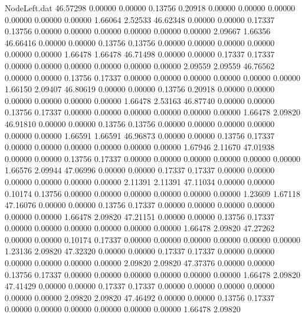 \begin{filecontents}{NodeLeft.dat}
  46.57298    0.00000    0.00000     0.13756    0.20918    0.00000    0.00000    0.00000    0.00000    0.00000    0.00000    1.66064    2.52533
  46.62348    0.00000    0.00000     0.17337    0.13756    0.00000    0.00000    0.00000    0.00000    0.00000    0.00000    2.09667    1.66356
  46.66416    0.00000    0.00000     0.13756    0.13756    0.00000    0.00000    0.00000    0.00000    0.00000    0.00000    1.66478    1.66478
  46.71498    0.00000    0.00000     0.17337    0.17337    0.00000    0.00000    0.00000    0.00000    0.00000    0.00000    2.09559    2.09559
  46.76562    0.00000    0.00000     0.13756    0.17337    0.00000    0.00000    0.00000    0.00000    0.00000    0.00000    1.66150    2.09407
  46.80619    0.00000    0.00000     0.13756    0.20918    0.00000    0.00000    0.00000    0.00000    0.00000    0.00000    1.66478    2.53163
  46.87740    0.00000    0.00000     0.13756    0.17337    0.00000    0.00000    0.00000    0.00000    0.00000    0.00000    1.66478    2.09820
  46.91810    0.00000    0.00000     0.13756    0.13756    0.00000    0.00000    0.00000    0.00000    0.00000    0.00000    1.66591    1.66591
  46.96873    0.00000    0.00000     0.13756    0.17337    0.00000    0.00000    0.00000    0.00000    0.00000    0.00000    1.67946    2.11670
  47.01938    0.00000    0.00000     0.13756    0.17337    0.00000    0.00000    0.00000    0.00000    0.00000    0.00000    1.66576    2.09944
  47.06996    0.00000    0.00000     0.17337    0.17337    0.00000    0.00000    0.00000    0.00000    0.00000    0.00000    2.11391    2.11391
  47.11034    0.00000    0.00000     0.10174    0.13756    0.00000    0.00000    0.00000    0.00000    0.00000    0.00000    1.23609    1.67118
  47.16076    0.00000    0.00000     0.13756    0.17337    0.00000    0.00000    0.00000    0.00000    0.00000    0.00000    1.66478    2.09820
  47.21151    0.00000    0.00000     0.13756    0.17337    0.00000    0.00000    0.00000    0.00000    0.00000    0.00000    1.66478    2.09820
  47.27262    0.00000    0.00000     0.10174    0.17337    0.00000    0.00000    0.00000    0.00000    0.00000    0.00000    1.23136    2.09820
  47.32320    0.00000    0.00000     0.17337    0.17337    0.00000    0.00000    0.00000    0.00000    0.00000    0.00000    2.09820    2.09820
  47.37376    0.00000    0.00000     0.13756    0.17337    0.00000    0.00000    0.00000    0.00000    0.00000    0.00000    1.66478    2.09820
  47.41429    0.00000    0.00000     0.17337    0.17337    0.00000    0.00000    0.00000    0.00000    0.00000    0.00000    2.09820    2.09820
  47.46492    0.00000    0.00000     0.13756    0.17337    0.00000    0.00000    0.00000    0.00000    0.00000    0.00000    1.66478    2.09820

\end{filecontents}
